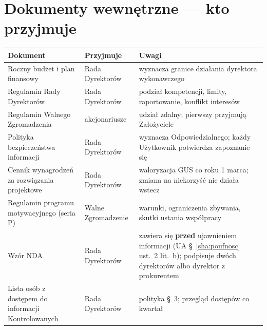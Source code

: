 \documentclass[11pt,a4paper]{report}
\begin{document}
\section{Dokumenty wewnętrzne --- kto przyjmuje}

\begin{tabularx}{\linewidth}{@{}>{\raggedright\arraybackslash}p{4.0cm} >{\raggedright\arraybackslash}p{3.3cm} X@{}}
\toprule
\textbf{Dokument} & \textbf{Przyjmuje} & \textbf{Uwagi} \\
\midrule
Roczny budżet i plan finansowy & Rada Dyrektorów & wyznacza granice działania dyrektora wykonawczego \\
Regulamin Rady Dyrektorów & Rada Dyrektorów & podział kompetencji, limity, raportowanie, konflikt interesów \\
Regulamin Walnego Zgromadzenia & akcjonariusze & udział zdalny; pierwszy przyjmują Założyciele \\
Polityka bezpieczeństwa informacji & Rada Dyrektorów & wyznacza Odpowiedzialnego; każdy Użytkownik potwierdza zapoznanie się \\
Cennik wynagrodzeń za rozwiązania projektowe & Rada Dyrektorów & waloryzacja GUS co roku 1 marca; zmiana na niekorzyść nie działa wstecz \\
Regulamin programu motywacyjnego (seria P) & Walne Zgromadzenie & warunki, ograniczenia zbywania, skutki ustania współpracy \\
Wzór NDA & Rada Dyrektorów & zawiera się \textbf{przed} ujawnieniem informacji (UA §~\ref{sha:poufnosc} ust.~2 lit.~b); podpisuje dwóch dyrektorów albo dyrektor z prokurentem \\
Lista osób z dostępem do informacji Kontrolowanych & Rada Dyrektorów & polityka §~3; przegląd dostępów co kwartał \\
\bottomrule
\end{tabularx}
\end{document}

